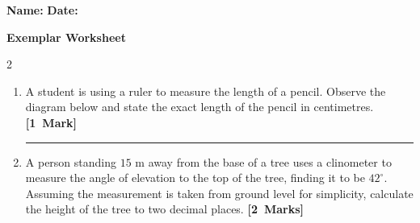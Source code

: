 \documentclass[11pt, a4paper]{article}
\begin{document}
\sloppy

\noindent\textbf{Name:} \makebox[4cm]{\hrulefill} \hfill \textbf{Date:} \makebox[3cm]{\hrulefill}
\begin{center}
    {\Large \textbf{ Exemplar Worksheet }}
\end{center}

\begin{multicols*}{2}
\begin{enumerate}[label=\textbf{\arabic*.}, leftmargin=*]

\item A student is using a ruler to measure the length of a pencil. Observe the diagram below and state the exact length of the pencil in centimetres. \hfill\quad\mbox{\textbf{[1 Mark]}}

\begin{center}
\end{center}

\vspace{0.2cm}
\noindent\rule{\linewidth}{0.4pt}

\item A person standing $15$ m away from the base of a tree uses a clinometer to measure the angle of elevation to the top of the tree, finding it to be $42^\circ$. Assuming the measurement is taken from ground level for simplicity, calculate the height of the tree to two decimal places. \hfill\quad\mbox{\textbf{[2 Marks]}}


\end{enumerate}
\end{multicols*}
\end{document}
